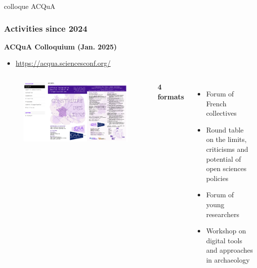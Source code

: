 \documentclass[t,aspectratio=169,xcolor=dvipsnames]{beamer}
\begin{document}
\begin{frame}{colloque ACQuA}

    \frametitle{Activities since 2024} 

    \begin{block}{\textbf{ACQuA Colloquium (Jan. 2025)}}
    	\begin{itemize}
    		\item \href{https://acqua.sciencesconf.org/}{https://acqua.sciencesconf.org/}
    	\end{itemize}
    \end{block}
    
    
    \begin{columns}[t]
    	
    	
    	\begin{figure}
    		\includegraphics[height=0.48\textheight]{figures/acqua2025.png}
    	\end{figure}
    	
    	
    	\textbf{4 formats}
    	
    	\begin{itemize}
    		\item Forum of French collectives %
    		\item Round table on the limits, criticisms and potential of open sciences policies %
    		\item Forum of young researchers %
    		\item Workshop on digital tools and approaches in archaeology %
    	\end{itemize}
    	
    \end{columns}
  
\end{frame}
\end{document}
